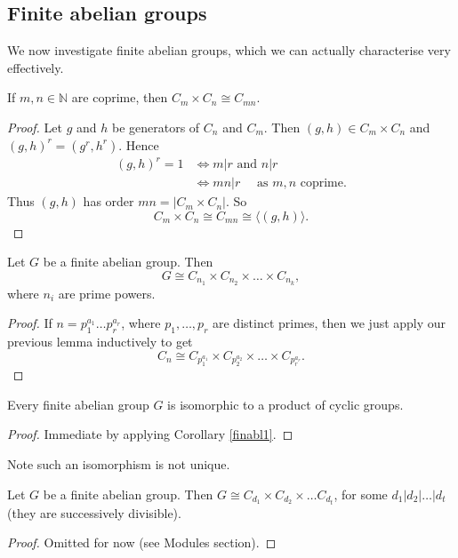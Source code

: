 \documentclass[egregdoesnotlikesansseriftitles,a4paper]{scrartcl}
\begin{document}
\subsection{Finite abelian groups}\label{finablsec}
We now investigate finite abelian groups, which we can actually characterise very effectively.
\begin{lemma}
      If $m,n \in \mathbb{N}$ are coprime, then $C_m \times C_n \cong C_{mn}$.
      \begin{proof}
            Let $g$ and $h$ be generators of $C_n$ and $C_m$. Then $(g,h)\in C_m \times C_n$ and $(g,h)^{r}=(g^{r}, h^{r})$. Hence 
            \begin{align*}
                 (g,h)^{r}=1 &\iff m|r \text{ and } n|r\\
                 & \iff mn|r \quad \text{ as } m,n \text{ coprime}.
            \end{align*}
            Thus $(g,h)$ has order $mn =|C_m \times C_n|$. So \[
            C_m \times C_n \cong C_{mn} \cong \langle (g,h) \rangle 
            .\]
      \end{proof}
\end{lemma}
\begin{corollary}\label{finabl1}
     Let $G$ be a finite abelian group. Then \[
     G \cong C_{n_1 } \times C_{n_2 }\times \ldots \times C_{n_k}
     ,\] where $n_{i}$ are prime powers. 
     \begin{proof}
            If $n=p_1^{a_1 }\ldots p_r ^{a_r}$, where $p_1 ,\ldots , p_r$ are distinct primes, then we just apply our previous lemma inductively to get \[
            C_{n}\cong C_{p_1 ^{a_1 }}\times C_{p_2 ^{a_2 }}\times \ldots \times C_{p_r ^{a_r }}
            .\] 
      \end{proof}
\end{corollary}
\begin{theorem}\label{finabl2}
     Every finite abelian group $G$ is isomorphic to a product of cyclic groups.
     \begin{proof}
            Immediate by applying Corollary \ref{finabl1}.
      \end{proof}
     \begin{remark}
            Note such an isomorphism is not unique.
     \end{remark}
\end{theorem}
\begin{theorem}\label{finabl3}
      Let $G$ be a finite abelian group. Then $G \cong C_{d_1 }\times C_{d_2 }\times \ldots C_{d_t}$, for some $d_1 | d_2 | \ldots | d_t$ (they are successively divisible).
      \begin{proof}
              Omitted for now (see Modules section).
      \end{proof}
\end{theorem}
\end{document}

